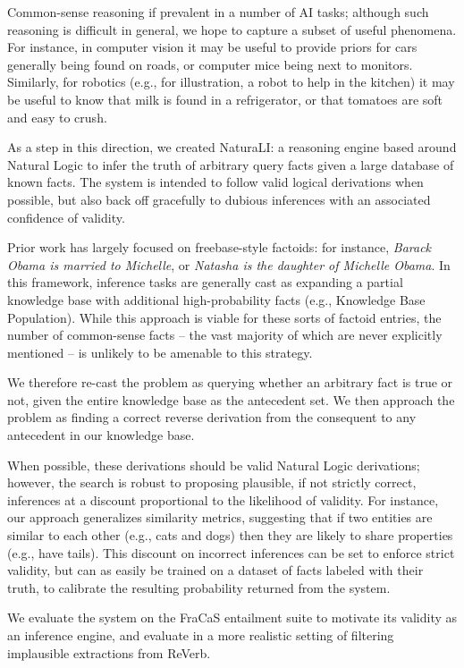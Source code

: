 Common-sense reasoning if prevalent in a number of AI tasks;
  although such reasoning is difficult in general, we hope to
  capture a subset of useful phenomena.
For instance, in computer vision it may be useful to provide priors
  for cars generally being found on roads, or
  computer mice being next to monitors.
Similarly, for robotics (e.g., for illustration, a robot to help in
  the kitchen) it may be useful to know that milk is found
  in a refrigerator, or that tomatoes are soft and easy to crush.

As a step in this direction, we created NaturaLI: a reasoning engine
  based around Natural Logic to infer the truth of arbitrary query
  facts given a large database of known facts.
The system is intended to follow valid logical derivations when possible,
  but also back off gracefully to dubious inferences with an
  associated confidence of validity.

Prior work has largely focused on freebase-style factoids:
  for instance, \textit{Barack Obama is married to Michelle}, or
  \textit{Natasha is the daughter of Michelle Obama}.
In this framework, inference tasks are generally cast as expanding
  a partial knowledge base with additional high-probability facts
  (e.g., Knowledge Base Population).
While this approach is viable for these sorts of factoid entries,
  the number of common-sense facts -- the vast majority of which are
  never explicitly mentioned -- is unlikely to be amenable to this
  strategy.

We therefore re-cast the problem as querying whether an arbitrary fact
  is true or not, given the entire knowledge base as the
  antecedent set.
We then approach the problem as finding a correct reverse derivation
  from the consequent to any antecedent in our knowledge base.

When possible, these derivations should be valid Natural Logic derivations;
  however, the search is robust to proposing plausible, if not
  strictly correct, inferences at a discount proportional to the
  likelihood of validity.
For instance, our approach generalizes similarity metrics, suggesting
  that if two entities are similar to each other (e.g., cats and dogs)
  then they are likely to share properties (e.g., have tails).
This discount on incorrect inferences can be set to enforce strict
  validity, but can as easily be trained on a dataset of facts labeled
  with their truth, to calibrate the resulting probability returned
  from the system.

We evaluate the system on the FraCaS entailment suite to motivate its
  validity as an inference engine, and evaluate in a more realistic
  setting of filtering implausible extractions from ReVerb.
